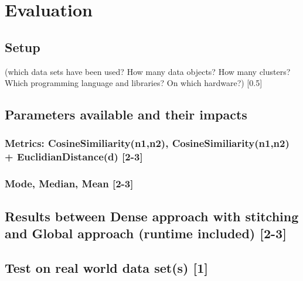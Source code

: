 \chapter{Evaluation}
\section{Setup}
(which data sets have been used? How many data objects? How many clusters? Which programming language and libraries? On which hardware?) [0.5]

\section{Parameters available and their impacts}
\subsection{Metrics: CosineSimiliarity(n1,n2), CosineSimiliarity(n1,n2) + EuclidianDistance(d) [2-3]}

\subsection{Mode, Median, Mean [2-3]}

\section{Results between Dense approach with stitching and Global approach (runtime included) [2-3]
}

\section{Test on real world data set(s) [1]}